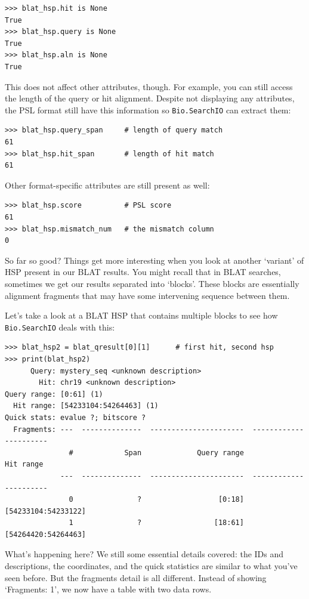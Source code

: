 \documentclass{report}
\begin{document}
\begin{verbatim}
>>> blat_hsp.hit is None
True
>>> blat_hsp.query is None
True
>>> blat_hsp.aln is None
True
\end{verbatim}

This does not affect other attributes, though. For example, you can still
access the length of the query or hit alignment. Despite not displaying any
attributes, the PSL format still have this information so \verb|Bio.SearchIO|
can extract them:

\begin{verbatim}
>>> blat_hsp.query_span     # length of query match
61
>>> blat_hsp.hit_span       # length of hit match
61
\end{verbatim}

Other format-specific attributes are still present as well:

\begin{verbatim}
>>> blat_hsp.score          # PSL score
61
>>> blat_hsp.mismatch_num   # the mismatch column
0
\end{verbatim}

So far so good? Things get more interesting when you look at another `variant'
of HSP present in our BLAT results. You might recall that in BLAT searches,
sometimes we get our results separated into `blocks'. These blocks are
essentially alignment fragments that may have some intervening sequence between
them.

Let's take a look at a BLAT HSP that contains multiple blocks to see how
\verb|Bio.SearchIO| deals with this:

\begin{verbatim}
>>> blat_hsp2 = blat_qresult[0][1]      # first hit, second hsp
>>> print(blat_hsp2)
      Query: mystery_seq <unknown description>
        Hit: chr19 <unknown description>
Query range: [0:61] (1)
  Hit range: [54233104:54264463] (1)
Quick stats: evalue ?; bitscore ?
  Fragments: ---  --------------  ----------------------  ----------------------
               #            Span             Query range               Hit range
             ---  --------------  ----------------------  ----------------------
               0               ?                  [0:18]     [54233104:54233122]
               1               ?                 [18:61]     [54264420:54264463]
\end{verbatim}

What's happening here? We still some essential details covered: the IDs and
descriptions, the coordinates, and the quick statistics are similar to what
you've seen before. But the fragments detail is all different. Instead of
showing `Fragments: 1', we now have a table with two data rows.
\end{document}
